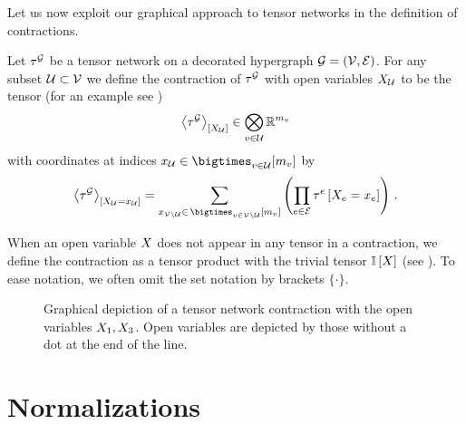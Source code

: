 Let us now exploit our graphical approach to tensor networks in the definition of contractions.

\begin{definition}
    \label{def:contraction}
    Let $\tau^{\mathcal{G}}$ be a tensor network on a decorated hypergraph $\mathcal{G}=(\mathcal{V},\mathcal{E})$.
    For any subset $\mathcal{U}\subset\mathcal{V}$ we define the contraction of $\tau^{\mathcal{G}}$ with open variables $X_{\mathcal{U}}$ to be the tensor (for an example see )
    \begin{align*}
        \left\langle \tau^{\mathcal{G}}\right\rangle_{\left[ X_{\mathcal{U}} \right]} \in \bigotimes_{v\in\mathcal{U}} \mathbb{R}^{m_{v}}
    \end{align*}
    with coordinates at indices $\catindexof{\secnodes}\in\bigtimes_{\node\in\secnodes}[\catdimof{\node}]$ by
    \begin{align*}
        \contractionof{\tnetof{\graph}}{\indexedcatvariableof{\secnodes}} =
        \sum_{\catindexof{\setwithout{\nodes}{\secnodes}} \in\,\nodestatesof{\setwithout{\nodes}{\secnodes}}}
        \left( \prod_{\edge\in\edges}\hypercoreofat{\edge}{\indexedcatvariableof{\edge}} \right) \, .
    \end{align*}
\end{definition}

When an open variable $X$ does not appear in any tensor in a contraction, we define the contraction as a tensor product with the trivial tensor $\mathbb{I}\left[X\right]$ (see ).
To ease notation, we often omit the set notation by brackets $\{\cdot\}$.

\begin{figure}
    \begin{center}
        
    \end{center}
    \caption{
        Graphical depiction of a tensor network contraction with the open variables $X_{1},X_{3}$.
        Open variables are depicted by those without a dot at the end of the line.
    }\label{fig:contraction}
\end{figure}



\section{Normalizations}

